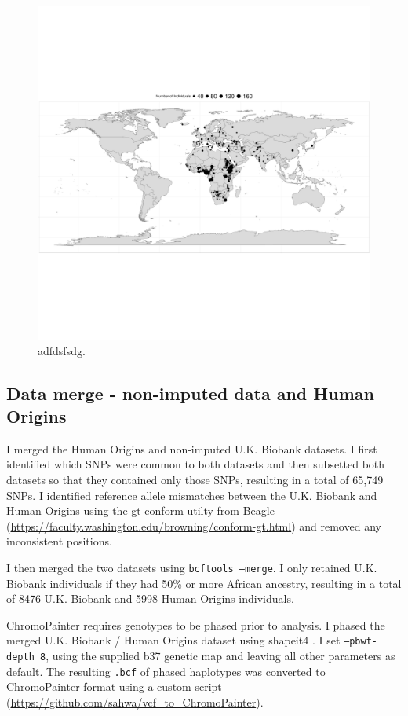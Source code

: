 \begin{figure}
    \centering
    \includegraphics[width=1.0\textwidth]{../images/chapter3/HumanOriginsMap.pdf}
    \caption{adfdsfsdg.}
    \label{fig:HumanOriginsMap}
\end{figure}

\subsection{Data merge - non-imputed data and Human Origins}

I merged the Human Origins and non-imputed U.K. Biobank datasets. I first identified which SNPs were common to both datasets and then subsetted both datasets so that they contained only those SNPs, resulting in a total of 65,749 SNPs. I identified reference allele mismatches between the U.K. Biobank and Human Origins using the gt-conform utilty from Beagle (\url{https://faculty.washington.edu/browning/conform-gt.html}) and removed any inconsistent positions. 

I then merged the two datasets using \texttt{bcftools --merge}. I only retained U.K. Biobank individuals if they had 50\% or more African ancestry, resulting in a total of 8476 U.K. Biobank and 5998 Human Origins individuals. 

ChromoPainter requires genotypes to be phased prior to analysis. I phased the merged U.K. Biobank / Human Origins dataset using shapeit4 \cite{delaneau2018integrative}. I set \texttt{--pbwt-depth 8}, using the supplied b37 genetic map and leaving all other parameters as default. The resulting \texttt{.bcf} of phased haplotypes was converted to ChromoPainter format using a custom script (\url{https://github.com/sahwa/vcf_to_ChromoPainter}).

